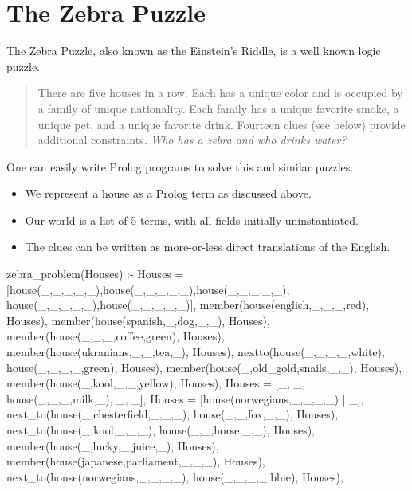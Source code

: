\section{The Zebra Puzzle}\label{subsec:zebra}
The Zebra Puzzle, also known as the Einstein's Riddle, is a well known logic puzzle.
\begin{quotation}
There are five houses in a row. Each has a unique color and is occupied by a family of unique nationality. Each family has a unique favorite smoke, a unique pet, and a unique favorite drink. Fourteen clues (see below) provide additional constraints. \textit{Who has a zebra and who drinks water?}
\end{quotation}

One can easily write Prolog programs to solve this and similar puzzles.
\begin{itemize}
\item We represent a house as a Prolog  term as discussed above.
\item Our world is a list of 5  terms, with all fields initially uninstantiated.
\smallv

\item The clues can be written as more-or-less direct translations of the English.
\end{itemize}

\begin{python}
zebra_problem(Houses) :-
    Houses = [house(_,_,_,_,_),house(_,_,_,_,_),house(_,_,_,_,_),
              house(_,_,_,_,_),house(_,_,_,_,_)],
    member(house(english,_,_,_,red), Houses),
    member(house(spanish,_,dog,_,_), Houses),
    member(house(_,_,_,coffee,green), Houses),
    member(house(ukranians,_,_,tea,_), Houses),
    nextto(house(_,_,_,_,white), house(_,_,_,_,green), Houses),
    member(house(_,old_gold,snails,_,_), Houses),
    member(house(_,kool,_,_,yellow), Houses),
    Houses = [_, _, house(_,_,_,milk,_), _, _],
    Houses = [house(norwegians,_,_,_,_) | _],
    next_to(house(_,chesterfield,_,_,_), house(_,_,fox,_,_), Houses),
    next_to(house(_,kool,_,_,_), house(_,_,horse,_,_), Houses),
    member(house(_,lucky,_,juice,_), Houses),
    member(house(japanese,parliament,_,_,_), Houses),
    next_to(house(norwegians,_,_,_,_), house(_,_,_,_,blue), Houses),
\end{python}


